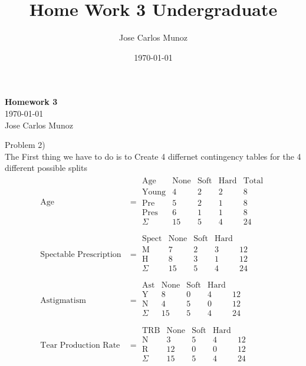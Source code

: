 \documentclass[12pt,english]{article}
\title{Home Work 3 Undergraduate}
\date{\today}
\author{Jose Carlos Munoz}
\begin{document}
\begin{center}
    \Large
    \textbf{Homework 3}\\
    \small
    \today\\
    \large
    Jose Carlos Munoz
\end{center}%
\par
Problem 2)\\
The First thing we have to do is to Create 4 differnet contingency tables for the 4 different possible splits
\begin{equation}\tag{1}\label{eq:1}
\begin{split}
\mbox{Age} &= 
\begin{array}{c|ccc|c}
\mbox{Age}   & \mbox{None} & \mbox{Soft} & \mbox{Hard} & \mbox{Total}\\
\hline
\mbox{Young} & 4           & 2           & 2           &  8\\
\mbox{Pre}   & 5           & 2           & 1           &  8\\
\mbox{Pres}  & 6           & 1           & 1           &  8\\
\hline
\Sigma       & 15          & 5           & 4           & 24\\
\end{array}
\\
\mbox{Spectable Prescription} &= 
\begin{array}{c|ccc|c}
\mbox{Spect} & \mbox{None} & \mbox{Soft} & \mbox{Hard} & \\
\hline
\mbox{M}     & 7           & 2           & 3           & 12\\
\mbox{H}     & 8           & 3           & 1           & 12\\
\hline
\Sigma       & 15          & 5           & 4           & 24\\
\end{array}
\\
\mbox{Astigmatism } &=
\begin{array}{c|ccc|c}
\mbox{Ast}   & \mbox{None} & \mbox{Soft} & \mbox{Hard} & \\
\hline
\mbox{Y}     & 8           & 0           & 4           & 12\\
\mbox{N}     & 4           & 5           & 0           & 12\\
\hline
\Sigma       & 15          & 5           & 4           & 24\\
\end{array}
\\
\mbox{Tear Production Rate} &=
\begin{array}{c|ccc|c}
\mbox{TRB}   & \mbox{None} & \mbox{Soft} & \mbox{Hard} & \\
\hline
\mbox{N}     & 3           & 5           & 4           & 12\\
\mbox{R}     & 12          & 0           & 0           & 12\\
\hline
\Sigma       & 15          & 5           & 4           & 24\\
\end{array}
\end{split}
\end{equation}
\end{document}
